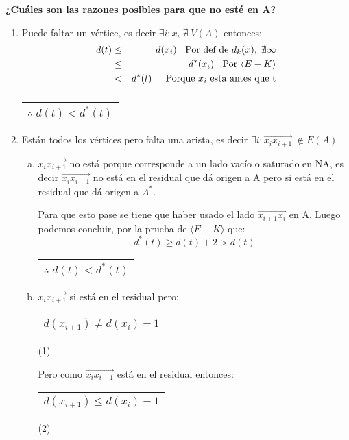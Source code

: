 \documentclass[12pt,a4paper]{report}
\newcounter{neq}
\begin{document}
			\vspace{5mm}
			\textbf{¿Cuáles son las razones posibles para que no esté en A?}
				\begin{enumerate}
					\item Puede faltar un vértice, es decir $\exists i : x_{i} \; \nexists \; V(A)$ entonces:
						\begin{eqnarray}
							\nonumber d(t) &\leq & d(x_{i}) \; \; \textup{ Por def de } d_{k}(x), \; \nexists \infty \\
							\nonumber &\leq & d^{*}(x_{i}) \; \; \textup { Por } \langle E-K \rangle \\
							\nonumber &< & d^{*}(t) \; \; \; \; \textup{ Porque } x_{i} \textup{ esta antes que t}
						\end{eqnarray}
						$\qquad\qquad\qquad\qquad\;$
						\begin{tabular}{|c|} \hline $\therefore \; d(t) < d^{*}(t)$ \\\hline \end{tabular}
					\item Están todos los vértices pero falta una arista, es decir $\exists i : \overrightarrow{x_{i}x_{i + 1}} \; \notin E(A)$.
						\begin{enumerate}[a)]
							\item $\overrightarrow{x_{i}x_{i + 1}}$ no está porque corresponde a un lado vacío o saturado en NA, es decir $\overrightarrow{x_{i}x_{i + 1}}$ no está en el residual que dá origen a A pero si está en el residual que dá origen a $A^{*}$.
								\par Para que esto pase se tiene que haber usado el lado $\overrightarrow{x_{i + 1}x_{i}}$ en A. Luego podemos concluir, por la prueba de $\langle E-K\rangle$ que:
								\[ d^{*}(t) \geq d(t) + 2 > d(t) \]
								$\qquad\qquad\qquad\qquad\qquad\qquad$
								\begin{tabular}{|c|} \hline $\therefore \; d(t) < d^{*}(t)$ \\\hline \end{tabular}
							\item $\overrightarrow{x_{i}x_{i + 1}}$ si está en el residual pero:
								\begin{tabular}{|c|} \hline $d(x_{i+1}) \neq d(x_{i}) +1 $ \\ \hline \end{tabular} (1)

								\vspace{5mm}
								\par Pero como $\overrightarrow{x_{i}x_{i + 1}}$ está en el residual entonces:
								\begin{tabular}{|c|} \hline $d(x_{i+1}) \leq d(x_{i}) +1 $ \\ \hline \end{tabular} (2)


\end{enumerate}
\end{enumerate}
\end{document}
